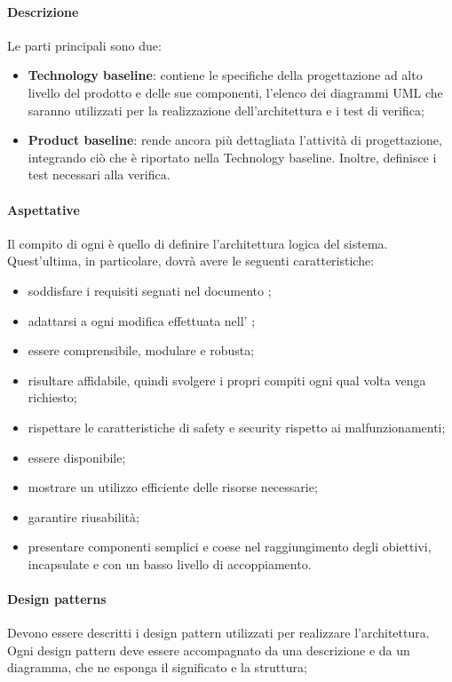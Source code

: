 \paragraph{Descrizione}
Le parti principali sono due:
\begin{itemize}
\item \textbf{Technology baseline}: contiene le specifiche della progettazione ad alto livello del prodotto e delle sue componenti,  l'elenco dei diagrammi UML che saranno utilizzati per la realizzazione dell'architettura e i test di verifica;
\item \textbf{Product baseline}: rende ancora più dettagliata l'attività di progettazione, integrando ciò che è riportato nella Technology baseline. Inoltre, definisce i test necessari alla verifica.
\end{itemize}
\paragraph{Aspettative}
Il compito di ogni \prog{} è quello di definire l'architettura logica del sistema. Quest'ultima, in particolare, dovrà avere le seguenti caratteristiche:
\begin{itemize}
\item soddisfare i requisiti segnati nel documento \AdR{};
\item adattarsi a ogni modifica effettuata nell' \AdR{};
\item essere comprensibile, modulare e robusta;
\item risultare affidabile, quindi svolgere i propri compiti ogni qual volta venga richiesto;
\item rispettare le caratteristiche di safety e security rispetto ai malfunzionamenti;
\item essere disponibile;
\item mostrare un utilizzo efficiente delle risorse necessarie;
\item garantire riusabilità;
\item presentare componenti semplici e coese nel raggiungimento degli obiettivi, incapsulate e con un basso livello di accoppiamento.
\end{itemize}
\paragraph{Design patterns}
Devono essere descritti i design pattern utilizzati per realizzare l'architettura. Ogni design pattern deve essere accompagnato da una descrizione e da un diagramma, che ne esponga il significato e la struttura;
